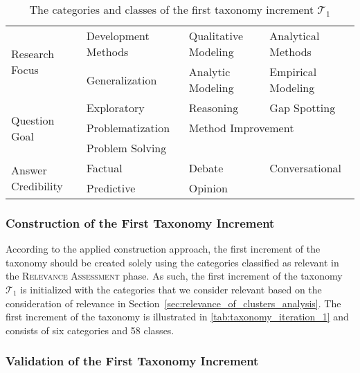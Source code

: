 \begin{table}[t]
{\begin{tabular}{|l|lll|}
 \hline
\multirow{2}{*}{Research Focus} & \multicolumn{1}{l|}{Development Methods} & \multicolumn{1}{l|}{Qualitative Modeling} & Analytical Methods \\ \cline{2-4} 
 & \multicolumn{1}{l|}{Generalization} & \multicolumn{1}{l|}{Analytic Modeling} & Empirical Modeling \\
 \hline
\multirow{3}{*}{Question Goal} & \multicolumn{1}{l|}{Exploratory} & \multicolumn{1}{l|}{Reasoning} & Gap Spotting \\ \cline{2-4} 
 & \multicolumn{1}{l|}{Problematization} & \multicolumn{2}{l|}{Method Improvement} \\ \cline{2-4} 
 & \multicolumn{3}{l|}{Problem Solving} \\
 \hline
\multirow{2}{*}{Answer Credibility} & \multicolumn{1}{l|}{Factual} & \multicolumn{1}{l|}{Debate} & Conversational \\ \cline{2-4} 
 & \multicolumn{1}{l|}{Predictive} & \multicolumn{2}{l|}{Opinion}  \\ 
 \hline
\end{tabular}%
}
\caption[Categories and Classes of the First Taxonomy Increment]{The categories and classes of the first taxonomy increment $\mathcal{T}_1$}
\label{tab:taxonomy_iteration_1}
\end{table}

\subsubsection{Construction of the First Taxonomy Increment}
According to the applied construction approach, the first increment of the taxonomy should be created solely using the categories classified as relevant in the \textsc{Relevance Assessment} phase. As such, the first increment of the taxonomy $\mathcal{T}_1$ is initialized with the categories that we consider relevant based on the consideration of relevance in Section~\ref{sec:relevance_of_clusters_analysis}. The first increment of the taxonomy is illustrated in \autoref{tab:taxonomy_iteration_1} and consists of six categories and 58 classes.


\subsubsection{Validation of the First Taxonomy Increment} 

